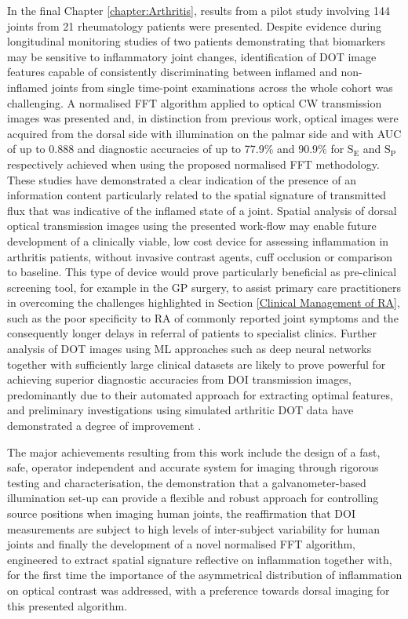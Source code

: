 \documentclass[twoside]{bhamthesis}
\theoremstyle{definition}
\begin{document}
In the final Chapter \ref{chapter:Arthritis}, results from a pilot study involving 144 joints from 21 rheumatology patients were presented. Despite evidence during longitudinal monitoring studies of two patients demonstrating that biomarkers may be sensitive to inflammatory joint changes, identification of DOT image features capable of consistently discriminating between inflamed and non-inflamed joints from single time-point examinations across the whole cohort was challenging. A normalised FFT algorithm applied to optical CW transmission images was presented and, in distinction from previous work, optical images were acquired from the dorsal side with illumination on the palmar side and with AUC of up to 0.888 and diagnostic accuracies of up to 77.9\% and 90.9\% for $\mathrm{S_E}$ and $\mathrm{S_P}$ respectively achieved when using the proposed normalised FFT methodology. These studies have demonstrated a clear indication of the presence of an information content particularly related to the spatial signature of transmitted flux that was indicative of the inflamed state of a joint. Spatial analysis of dorsal optical transmission images using the presented work-flow may enable future development of a clinically viable, low cost device for assessing inflammation in arthritis patients, without invasive contrast agents, cuff occlusion or comparison to baseline. This type of device would prove particularly beneficial as pre-clinical screening tool, for example in the GP surgery, to assist primary care practitioners in overcoming the challenges highlighted in Section \ref{Clinical Management of RA}, such as the poor specificity to RA of commonly reported joint symptoms and the consequently longer delays in referral of patients to specialist clinics. Further analysis of DOT images using ML approaches such as deep neural networks together with sufficiently large clinical datasets are likely to prove powerful for achieving superior diagnostic accuracies from DOI transmission images, predominantly due to their automated approach for extracting optimal features, and preliminary investigations using simulated arthritic DOT data have demonstrated a degree of improvement \cite{dehghani2019deep}. 

The major achievements resulting from this work include the design of a fast, safe, operator independent and accurate system for imaging through rigorous testing and characterisation, the demonstration that a galvanometer-based illumination set-up can provide a flexible and robust approach for controlling source positions when imaging human joints, the reaffirmation that DOI measurements are subject to high levels of inter-subject variability for human joints and finally the development of a novel normalised FFT algorithm, engineered to extract spatial signature reflective on inflammation together with, for the first time the importance of the asymmetrical distribution of inflammation on optical contrast was addressed, with a preference towards dorsal imaging for this presented algorithm. 
\end{document}

